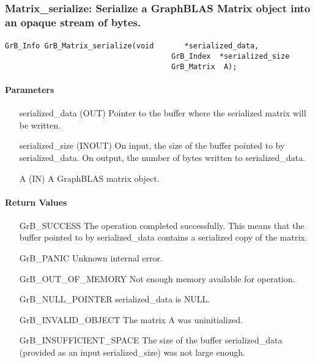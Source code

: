 \subsubsection{{\sf Matrix\_serialize}: Serialize a GraphBLAS Matrix object into an opaque stream of bytes. }
\label{Sec:Matrix_serialize}

\paragraph{\syntax}

\begin{Verbatim}[samepage=true]
        GrB_Info GrB_Matrix_serialize(void       *serialized_data,
                                      GrB_Index  *serialized_size
                                      GrB_Matrix  A);
\end{Verbatim}

\paragraph{Parameters}

\begin{itemize}[leftmargin=1.1in]
    \item[{\sf serialized\_data}] ({\sf OUT}) Pointer to the buffer where the serialized matrix will be written.
    \item[{\sf serialized\_size}] ({\sf INOUT}) On input, the size of the buffer pointed to by {\sf serialized\_data}. On output, the number of bytes written to {\sf serialized\_data}.
    \item[{\sf A}]      ({\sf IN}) A GraphBLAS matrix object.
\end{itemize}

\paragraph{Return Values}

\begin{itemize}[leftmargin=2.3in]
    \item[{\sf GrB\_SUCCESS}]         The operation completed successfully. This
      means that the buffer pointed to by {\sf serialized\_data} contains a
      serialized copy of the matrix.

    \item[{\sf GrB\_PANIC}]           Unknown internal error.
    
    \item[{\sf GrB\_OUT\_OF\_MEMORY}] Not enough memory available for operation.
    
    \item[{\sf GrB\_NULL\_POINTER}]  {\sf serialized\_data} is {\sf NULL}.

    \item[{\sf GrB\_INVALID\_OBJECT}]  The matrix {\sf A} was uninitialized.

    \item[{\sf GrB\_INSUFFICIENT\_SPACE}]  The size of the buffer {\sf serialized\_data} (provided as an input {\sf serialized\_size}) was not large enough.
\end{itemize}

